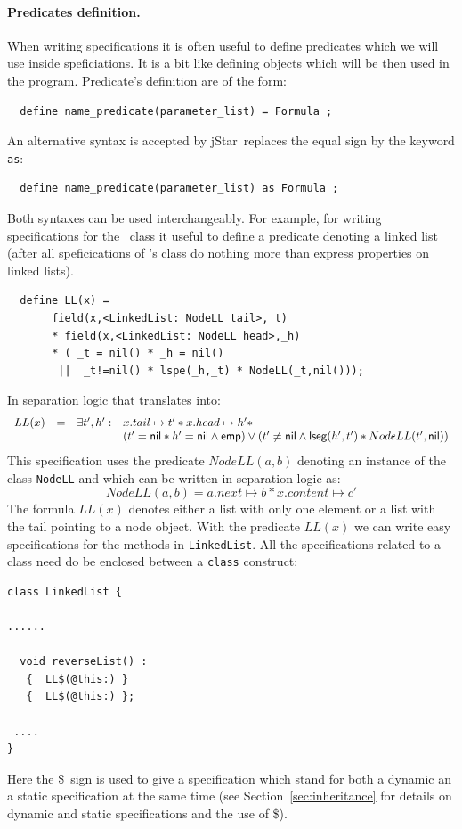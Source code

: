 \documentclass[11pt]{article}
\newcommand{\jStar}{{\sf jStar}}
\newcommand{\psto}{\mapsto}
\newcommand{\emp}{{\sf emp}}
\newcommand{\lseg}{{\sf lseg}}
\newcommand{\nil}{{\sf nil}}
\newcommand{\dollar}{\mbox{\$}}
\begin{document}
\paragraph{Predicates definition.}
When writing specifications it is often useful to define predicates
which we will use inside speficiations. It is a bit like defining
objects which will be then used in the program. Predicate's definition
are of the form:
\begin{verbatim}
  define name_predicate(parameter_list) = Formula ;
\end{verbatim}
An alternative syntax is accepted by \jStar \ replaces the equal sign by the keyword {\tt as}:
\begin{verbatim}
  define name_predicate(parameter_list) as Formula ;
\end{verbatim}
Both syntaxes can be used interchangeably.
For example, for writing specifications for the \linkedlist \ class it
useful to define a predicate denoting a linked list (after all
speficications of \linkedlist's class do nothing more than express
properties on linked lists).
\begin{verbatim}
  define LL(x) =  
       field(x,<LinkedList: NodeLL tail>,_t) 
       * field(x,<LinkedList: NodeLL head>,_h) 
       * ( _t = nil() * _h = nil() 
        ||  _t!=nil() * lspe(_h,_t) * NodeLL(_t,nil())); 
\end{verbatim}
%
In separation logic that translates into:
\[\begin{array}{llll}
 LL(x) & = &  \exists t',h':  &x.tail \psto t' * x.head \psto h' * 
\\
& & & (t'=\nil * h'=\nil \wedge \emp ) 
\vee 
(t' \neq \nil \wedge \lseg(h',t') *NodeLL(t',\nil) )  
\end{array}
\]
This specification uses the predicate $NodeLL(a,b)$ denoting an instance of the class {\tt NodeLL}
and which can be written in separation logic as:
\[
  NodeLL(a,b) = a.next \psto b * x.content \psto c' 
\]
The formula
$LL(x)$ denotes either a list with only one element or a list with
the tail pointing to a node object. With the predicate $LL(x)$ we can
write easy specifications for the methods in {\tt LinkedList}.
All the specifications related to a class need do be enclosed between
a {\tt class} construct:
\begin{verbatim}
class LinkedList {

......

  void reverseList() : 
   {  LL$(@this:) } 
   {  LL$(@this:) };

 ....
}
\end{verbatim}
Here the \dollar \ sign is used to give a specification which stand for both a dynamic an a static specification at the same time (see Section~\ref{sec:inheritance} for details on dynamic and static specifications and the use of \dollar).
\end{document}
